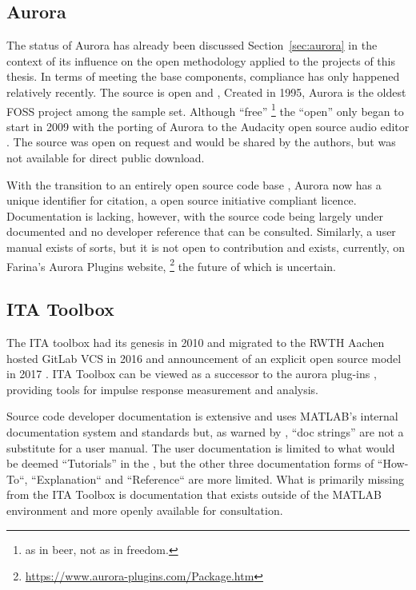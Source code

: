 \subsection{Aurora}

The status of Aurora has already been discussed Section~\ref{sec:aurora} in the context of its influence on the open methodology applied to the projects of this thesis. In terms of meeting the base components, compliance has only happened relatively recently. The source is open and
, \cite{farina_new_2009} Created in 1995, Aurora is the oldest FOSS project among the sample set. Although ``free''
\footnote{as in beer, not as in freedom.}
the ``open'' only began to start in 2009 with the porting of Aurora to the Audacity open source audio editor \cite{farina_new_2009}. The source was open on request and would be shared by the authors, but was not available for direct public download.

With the transition to an entirely open source code base \cite{farina_aurora_2025}, Aurora now has a unique identifier for citation, a open source initiative compliant licence. Documentation is lacking, however, with the source code being largely under documented and no developer reference that can be consulted. Similarly, a user manual exists of sorts, but it is not open to contribution and exists, currently, on Farina's Aurora Plugins website,
\footnote{\url{https://www.aurora-plugins.com/Package.htm}}
the future of which is uncertain.

\subsection{ITA Toolbox}

The ITA toolbox  had its genesis in 2010 \cite{dietrich_matlab_2010} and migrated to the RWTH Aachen hosted GitLab VCS in 2016 and announcement of  an explicit open source model in 2017 \cite{berzborn_ita_2017}. ITA Toolbox can be viewed as a successor to the aurora plug-ins \cite{dietrich_influence_2013}, providing tools for impulse response measurement and analysis. 

Source code developer documentation is extensive and uses MATLAB's internal documentation system and standards but, as warned by \textcite{stallman_gnu_1992}, ``doc strings'' are not a substitute for a user manual. The user documentation is limited to what would be deemed ``Tutorials'' in the  \cite{procida_diataxis_2025}, but the other three documentation forms of ``How-To``, ``Explanation`` and ``Reference`` are more limited. What is primarily missing from the ITA Toolbox is documentation that exists outside of the M\textsc{ATLAB} environment and more openly available for consultation. 

